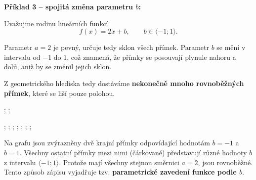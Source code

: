 \documentclass[12pt,a4paper]{article}
\begin{document}
\newpage
\begin{examplebox}
\textbf{Příklad 3 – spojitá změna parametru \(b\):}  

Uvažujme rodinu lineárních funkcí
\[
f(x) = 2x + b, \qquad b \in \langle -1; 1 \rangle.
\]

Parametr \(a = 2\) je pevný, určuje tedy sklon všech přímek.  
Parametr \(b\) se mění v intervalu od \(-1\) do \(1\), což znamená,  
že přímky se posouvají plynule nahoru a dolů, aniž by se změnil jejich sklon.

\medskip
Z geometrického hlediska tedy dostáváme \textbf{nekonečně mnoho rovnoběžných přímek},  
které se liší pouze polohou.

\begin{center}
\begin{axisgraph}[
    grid=none,
    xmin=-3, xmax=3,
    ymin=-3, ymax=5,
    title={Rodina přímek $f(x)=2x+b$, kde $b\in\langle -1;1\rangle$},
    axis lines=middle,
    width=10cm,
    height=6cm,
    domain=-3:3,
    samples=2
]
    ;
    ;

    ;
    ;
    ;
    ;
    ;
    ;
    ;

\end{axisgraph}
\end{center}

\noindent
Na grafu jsou zvýrazněny dvě krajní přímky odpovídající hodnotám \(b=-1\) a \(b=1\).  
Všechny ostatní přímky mezi nimi (čárkované) představují různé hodnoty \(b\) z intervalu \(\langle -1;1\rangle\).  
Protože mají všechny stejnou směrnici \(a=2\), jsou rovnoběžné.  
Tento způsob zápisu vyjadřuje tzv. \textbf{parametrické zavedení funkce podle $b$}.
\end{examplebox}
\end{document}

